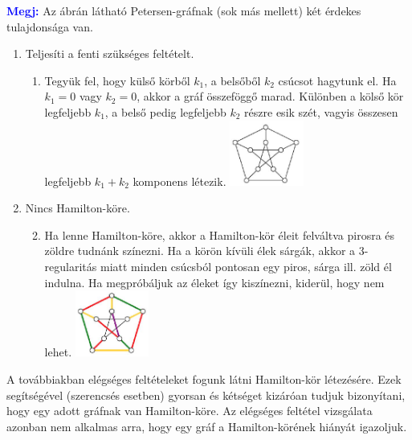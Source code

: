 \documentclass[../../szobeli.tex]{subfiles}
\begin{document}
\begin{itemize}
        \textcolor{blue}{\textbf{Megj:}} Az ábrán látható Petersen-gráfnak (sok más mellett) két érdekes tulajdonsága van. 

            \begin{enumerate}
                \item Teljesíti a fenti szükséges feltételt. 
                    \begin{enumerate}
                        \item Tegyük fel, hogy külső körből $k_1$, a belsőből $k_2$ csúcsot hagytunk el. Ha $k_1 = 0$ vagy $k_2 = 0$, akkor a gráf összeföggő marad. Különben a kölső kör legfeljebb $k_1$, a belső pedig legfeljebb $k_2$ részre esik szét, vagyis összesen legfeljebb $k_1 + k_2$ komponens létezik. \includegraphics[width=0.2\textwidth]{./img/5.png}
                    \end{enumerate}
                \item Nincs Hamilton-köre.
                    \begin{enumerate}
                        \setcounter{enumi}{1}
                        \item Ha lenne Hamilton-köre, akkor a Hamilton-kör éleit felváltva pirosra és zöldre tudnánk színezni. Ha a körön kívüli élek sárgák, akkor a 3-regularitás miatt minden csúcsból pontosan egy piros, sárga ill. zöld él indulna. Ha megpróbáljuk az éleket így kiszínezni, kiderül, hogy nem lehet. \includegraphics[width=0.2\textwidth]{./img/6.png}
                    \end{enumerate}
            \end{enumerate}
        
        A továbbiakban elégséges feltételeket fogunk látni Hamilton-kör létezésére. Ezek segítségével (szerencsés esetben) gyorsan és kétséget kizáróan tudjuk bizonyítani, hogy egy adott gráfnak van Hamilton-köre. Az elégséges feltétel vizsgálata azonban nem alkalmas arra, hogy egy gráf a Hamilton-körének hiányát igazoljuk.


\end{itemize}
\end{document}
